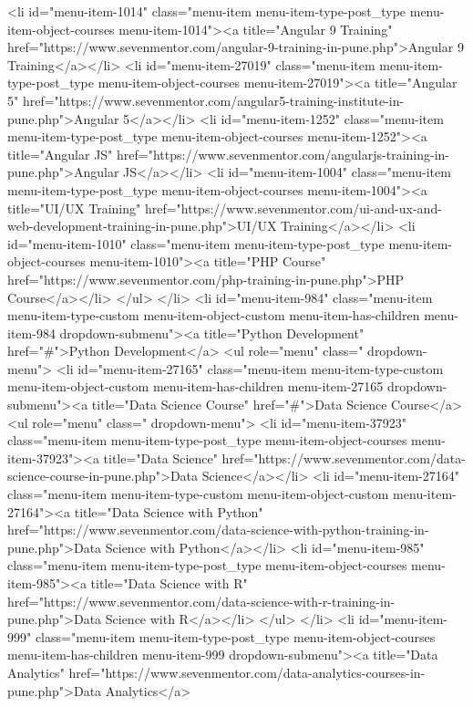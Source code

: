 {<li id="menu-item-1014" class="menu-item menu-item-type-post_type menu-item-object-courses menu-item-1014"><a title="Angular 9 Training" href="https://www.sevenmentor.com/angular-9-training-in-pune.php">Angular 9 Training</a></li>
<li id="menu-item-27019" class="menu-item menu-item-type-post_type menu-item-object-courses menu-item-27019"><a title="Angular 5" href="https://www.sevenmentor.com/angular5-training-institute-in-pune.php">Angular 5</a></li>
<li id="menu-item-1252" class="menu-item menu-item-type-post_type menu-item-object-courses menu-item-1252"><a title="Angular JS" href="https://www.sevenmentor.com/angularjs-training-in-pune.php">Angular JS</a></li>
<li id="menu-item-1004" class="menu-item menu-item-type-post_type menu-item-object-courses menu-item-1004"><a title="UI/UX Training" href="https://www.sevenmentor.com/ui-and-ux-and-web-development-training-in-pune.php">UI/UX Training</a></li>
<li id="menu-item-1010" class="menu-item menu-item-type-post_type menu-item-object-courses menu-item-1010"><a title="PHP Course" href="https://www.sevenmentor.com/php-training-in-pune.php">PHP Course</a></li>
</ul>
</li>
<li id="menu-item-984" class="menu-item menu-item-type-custom menu-item-object-custom menu-item-has-children menu-item-984 dropdown-submenu"><a title="Python Development" href="#">Python Development</a>
<ul role="menu" class=" dropdown-menu">
<li id="menu-item-27165" class="menu-item menu-item-type-custom menu-item-object-custom menu-item-has-children menu-item-27165 dropdown-submenu"><a title="Data Science Course" href="#">Data Science Course</a>
<ul role="menu" class=" dropdown-menu">
<li id="menu-item-37923" class="menu-item menu-item-type-post_type menu-item-object-courses menu-item-37923"><a title="Data Science" href="https://www.sevenmentor.com/data-science-course-in-pune.php">Data Science</a></li>
<li id="menu-item-27164" class="menu-item menu-item-type-custom menu-item-object-custom menu-item-27164"><a title="Data Science with Python" href="https://www.sevenmentor.com/data-science-with-python-training-in-pune.php">Data Science with Python</a></li>
<li id="menu-item-985" class="menu-item menu-item-type-post_type menu-item-object-courses menu-item-985"><a title="Data Science with R" href="https://www.sevenmentor.com/data-science-with-r-training-in-pune.php">Data Science with R</a></li>
</ul>
</li>
<li id="menu-item-999" class="menu-item menu-item-type-post_type menu-item-object-courses menu-item-has-children menu-item-999 dropdown-submenu"><a title="Data Analytics" href="https://www.sevenmentor.com/data-analytics-courses-in-pune.php">Data Analytics</a>
}
